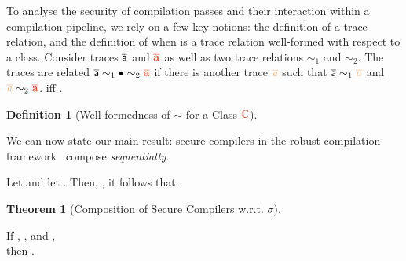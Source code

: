 \documentclass[acmsmall]{acmart}
\theoremstyle{definition}
\newtheorem{theorem}{Theorem}[section]
\newtheorem{definition}{Definition}[section]
\begin{document}
To analyse the security of compilation passes and their interaction within a compilation pipeline, we rely on a few key notions: the definition of a trace relation, and the definition of when is a trace relation well-formed with respect to a class.
%
Consider traces $\mathsf{\overline{a}}$ and $\trg{\trace}$ as well as two trace relations $\sim_1$ and $\sim_2$. 
% 
The traces are related $\src{\trace}\sim_1\bullet\sim_2\trg{\trace}$ if there is another trace $\irl{\trace}$ such that $\src{\trace}\sim_1\irl{\trace}$ and $\irl{\trace}\sim_2\trg{\trace}$.
% 
 iff .
\begin{definition}[Well-formedness of $\sim$ for a Class $\trg{\class}$]\label{def:wfc:sig:tracerel}

  \begin{nscenter}
  \noindent
  \text{\bul{$\wfcsig{\sim}{\trg{\class}}$}} \isdef \text{\rul{$\forall \trg{\pi}\in\trg{\class}, \sigma_\sim(\trg{\pi})\in\sigma_\sim(\trg{\class})$}}
  \end{nscenter}
\end{definition}

We can now state our main result: secure compilers in the robust compilation framework~\cite{abate2021extacc} compose {\em sequentially}. 
% 




Let  and let .
Then, , it follows that .
% 
\begin{theorem}[Composition of Secure Compilers w.r.t. $\sigma$]\label{thm:rtpsim:sig}
  $\;$ 

  If , , and , \\ then . \Coqed
\end{theorem}
\end{document}
